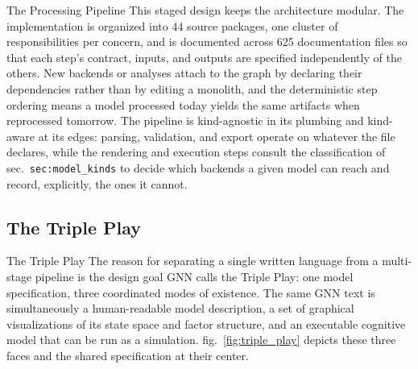 \documentclass[
  ignorenonframetext,
]{beamer}
\begin{document}
\begin{frame}{The Processing Pipeline}
This staged design keeps the architecture modular. The implementation is
organized into 44 source packages, one cluster of responsibilities per
concern, and is documented across 625 documentation files so that each
step's contract, inputs, and outputs are specified independently of the
others. New backends or analyses attach to the graph by declaring their
dependencies rather than by editing a monolith, and the deterministic
step ordering means a model processed today yields the same artifacts
when reprocessed tomorrow. The pipeline is kind-agnostic in its plumbing
and kind-aware at its edges: parsing, validation, and export operate on
whatever the file declares, while the rendering and execution steps
consult the classification of sec.~\texttt{sec:model\_kinds} to decide which
backends a given model can reach and record, explicitly, the ones it
cannot.
\end{frame}

\subsection{The Triple Play}\label{the-triple-play}

\begin{frame}{The Triple Play}
The reason for separating a single written language from a multi-stage
pipeline is the design goal GNN calls the Triple Play: one model
specification, three coordinated modes of existence. The same GNN text
is simultaneously a human-readable model description, a set of graphical
visualizations of its state space and factor structure, and an
executable cognitive model that can be run as a simulation.
fig.~\ref{fig:triple_play} depicts these three faces and the shared
specification at their center.

\end{frame}
\end{document}
